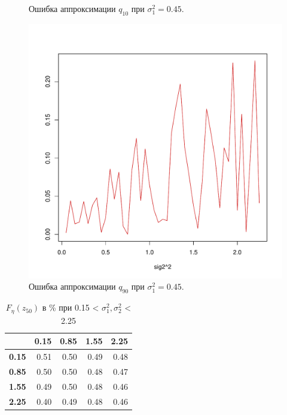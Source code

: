 \documentclass[12pt]{article}
\begin{document}
\begin{figure}[h]
\begin{center}
\begin{minipage}[h]{0.4\linewidth}
			\caption{Ошибка аппроксимации $q_{10}$ при $\sigma_{1}^{2} = 0.45$.}
			\label{ris8}
		\end{minipage}
	\hfill
	\begin{minipage}[h]{0.4\linewidth}
		\includegraphics[width=1\linewidth]{gr3.pdf}
		\caption{Ошибка аппроксимации $q_{90}$ при $\sigma_{1}^{2} = 0.45$.}
		\label{ris9}
	\end{minipage}
	\end{center}
\end{figure}

\begin{table}[!hhh]
	\centering
	\caption{$F_{\eta}(z_{50})$ в \% при 0.15 < $\sigma_{1}^{2}, \sigma_{2}^{2}$ < 2.25 }
	\label{tab4}
	\begin{tabular}{rrrrr}
		\hline
		& \textbf{0.15} & \textbf{0.85} & \textbf{1.55} & \textbf{2.25} \\
		\hline
		\textbf{0.15} & 0.51 & 0.50 & 0.49 & 0.48 \\ 
		\textbf{0.85} & 0.50 & 0.50 & 0.48 & 0.47 \\ 
		\textbf{1.55} & 0.49 & 0.50 & 0.48 & 0.46 \\ 
		\textbf{2.25} & 0.40 & 0.49 & 0.48 & 0.46 \\ 
		\hline
	\end{tabular}
\end{table}
\end{document}
